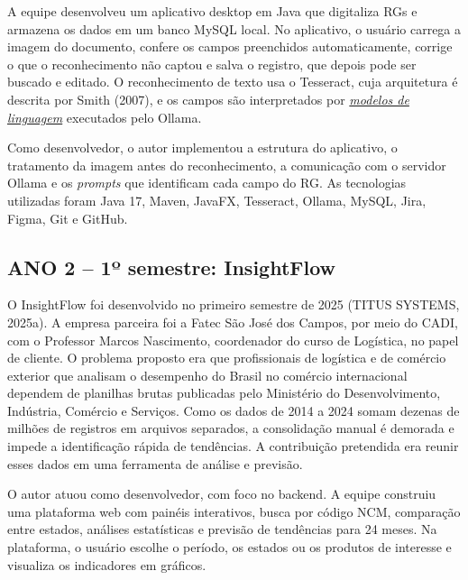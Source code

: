 \documentclass[12pt,a4paper]{article}
\newcommand{\termo}[2]{\hyperlink{gls:#1}{\textit{#2}}}
\begin{document}
A equipe desenvolveu um aplicativo desktop em Java que digitaliza RGs e armazena os dados em um banco MySQL local. No aplicativo, o usuário carrega a imagem do documento, confere os campos preenchidos automaticamente, corrige o que o reconhecimento não captou e salva o registro, que depois pode ser buscado e editado. O reconhecimento de texto usa o Tesseract, cuja arquitetura é descrita por Smith (2007), e os campos são interpretados por \termo{modelo}{modelos de linguagem} executados pelo Ollama.

Como desenvolvedor, o autor implementou a estrutura do aplicativo, o tratamento da imagem antes do reconhecimento, a comunicação com o servidor Ollama e os \textit{prompts} que identificam cada campo do RG. As tecnologias utilizadas foram Java 17, Maven, JavaFX, Tesseract, Ollama, MySQL, Jira, Figma, Git e GitHub.

\subsection{ANO 2 – 1º semestre: InsightFlow}

O InsightFlow foi desenvolvido no primeiro semestre de 2025 (TITUS SYSTEMS, 2025a). A empresa parceira foi a Fatec São José dos Campos, por meio do CADI, com o Professor Marcos Nascimento, coordenador do curso de Logística, no papel de cliente. O problema proposto era que profissionais de logística e de comércio exterior que analisam o desempenho do Brasil no comércio internacional dependem de planilhas brutas publicadas pelo Ministério do Desenvolvimento, Indústria, Comércio e Serviços. Como os dados de 2014 a 2024 somam dezenas de milhões de registros em arquivos separados, a consolidação manual é demorada e impede a identificação rápida de tendências. A contribuição pretendida era reunir esses dados em uma ferramenta de análise e previsão.

O autor atuou como desenvolvedor, com foco no backend. A equipe construiu uma plataforma web com painéis interativos, busca por código NCM, comparação entre estados, análises estatísticas e previsão de tendências para 24 meses. Na plataforma, o usuário escolhe o período, os estados ou os produtos de interesse e visualiza os indicadores em gráficos.
\end{document}
